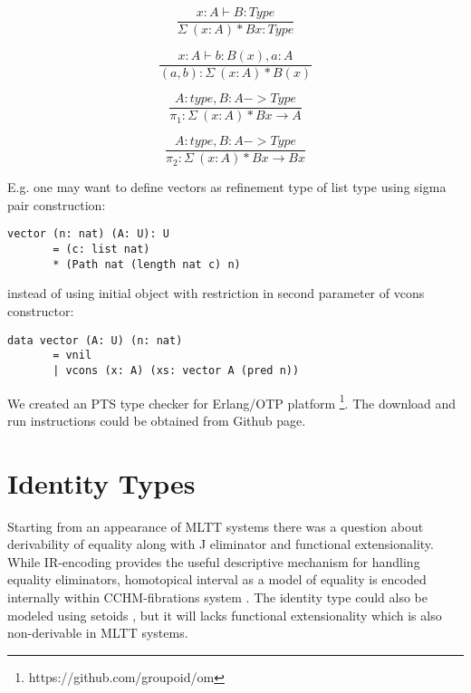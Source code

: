 \begin{equation}
\tag{$\Sigma$-formation}
\dfrac
{x:A \vdash B : Type}
{\Sigma\ (x:A) * B x : Type}
\end{equation}

\begin{equation}
\tag{$\Sigma$-intro}
\dfrac
{x:A \vdash b : B(x), a: A}
{(a,b) : \Sigma\ (x:A) * B(x) }
\end{equation}

\begin{equation}
\tag{$\pi_1$-elimination}
\dfrac
{A: type, B: A -> Type}
{\pi_1 : \Sigma\ (x:A) * B x \rightarrow A}
\end{equation}

\begin{equation}
\tag{$\pi_1$-elimination}
\dfrac
{A: type, B: A -> Type}
{\pi_2 : \Sigma\ (x:A) * B x \rightarrow B x}
\end{equation}

\newpage
E.g. one may want to define vectors as refinement type of list type using sigma pair construction:

\begin{lstlisting}[mathescape=true]
    vector (n: nat) (A: U): U
       = (c: list nat)
       * (Path nat (length nat c) n)
\end{lstlisting}

instead of using initial object with restriction in second parameter of vcons constructor:

\begin{lstlisting}[mathescape=true]
    data vector (A: U) (n: nat)
       = vnil
       | vcons (x: A) (xs: vector A (pred n))
\end{lstlisting}

We created an PTS type checker for Erlang/OTP platform \footnote{https://github.com/groupoid/om}.
The download and run instructions could be obtained from Github page.


\section{Identity Types}

Starting from an appearance of MLTT systems there was a question about derivability of equality
along with J eliminator and functional extensionality. While IR-encoding \cite{Dagand13} provides
the useful descriptive mechanism for handling equality eliminators, homotopical interval
as a model of equality is encoded internally within CCHM-fibrations system \cite{Orton17}. The
identity type could also be modeled using setoids \cite{Bishop67}, but it will lacks functional
extensionality which is also non-derivable in MLTT systems.

